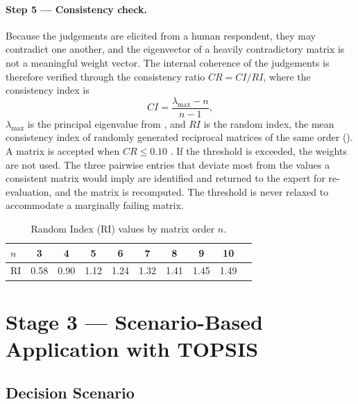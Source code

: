 \paragraph{Step 5 --- Consistency check.}
Because the judgements are elicited from a human respondent, they may contradict one
another, and the eigenvector of a heavily contradictory matrix is not a meaningful weight
vector. The internal coherence of the judgements is therefore verified through the
consistency ratio $CR = CI/RI$, where the consistency index is
\begin{equation}\label{eq:cr}
  CI = \frac{\lambda_{\max} - n}{\,n - 1\,},
\end{equation}
$\lambda_{\max}$ is the principal eigenvalue from , and $RI$ is the random
index, the mean consistency index of randomly generated reciprocal matrices of the same
order (). A matrix is accepted when $CR \le 0.10$
\parencite{Saaty2008DECISIONMW}. If the threshold is exceeded, the weights are not used.
The three pairwise entries that deviate most from the values a consistent matrix would
imply are identified and returned to the expert for re-evaluation, and the matrix is
recomputed. The threshold is never relaxed to accommodate a marginally failing matrix.

\begin{table}[htbp]
  \centering
  \caption{Random Index (RI) values by matrix order $n$.}
  \label{tab:ri}
  \begin{tabular}{@{}lccccccccc@{}}
    \toprule
    $n$ & 3 & 4 & 5 & 6 & 7 & 8 & 9 & 10 \\
    \midrule
    RI & 0.58 & 0.90 & 1.12 & 1.24 & 1.32 & 1.41 & 1.45 & 1.49 \\
    \bottomrule
  \end{tabular}
\end{table}

\section{Stage 3 --- Scenario-Based Application with TOPSIS}\label{sec:stage3}

\subsection{Decision Scenario}\label{subsec:scenario-design}


